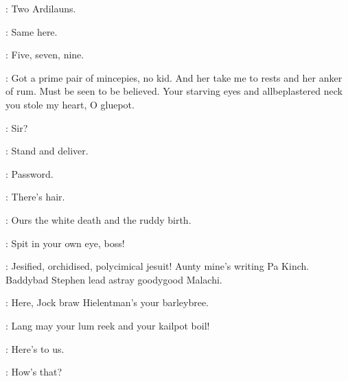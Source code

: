 \documentclass[12pt]{article}
\begin{document}
\Md: Two Ardilauns.

\Ly: Same here.



\Br: Five, seven, nine.


\Dx: Got a prime pair of mincepies, no kid.
And her take me to rests and her anker of rum.
Must be seen to be believed.
Your starving eyes and allbeplastered neck you stole my heart, O gluepot.

\Br: Sir?










\Ln: Stand and deliver.

\Cr: Password.

\PC: There's hair.

\Bl: Ours the white death and the ruddy birth.


\Ba: Spit in your own eye, boss!



\Mu: Jesified, orchidised, polycimical jesuit!
Aunty mine's writing Pa Kinch.
Baddybad Stephen lead astray goodygood Malachi.





\Ln: Here, Jock braw Hielentman's your barleybree.

\Cr: Lang may your lum reek and your kailpot boil!



\Dx: Here's to us.

\Md: How's that?
\end{document}

